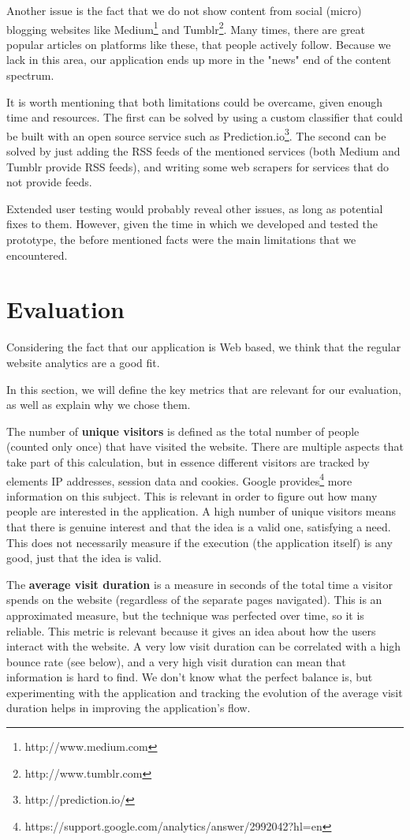 \documentclass{acm_proc_10ptArticle-sp}
\begin{document}
Another issue is the fact that we do not show content from social (micro) blogging websites like Medium\footnote{http://www.medium.com} and Tumblr\footnote{http://www.tumblr.com}. Many times, there are great popular articles on platforms like these, that people actively follow. Because we lack in this area, our application ends up more in the "news" end of the content spectrum.

It is worth mentioning that both limitations could be overcame, given enough time and resources. The first can be solved by using a custom classifier that could be built with an open source service such as Prediction.io\footnote{http://prediction.io/}. The second can be solved by just adding the RSS feeds of the mentioned services (both Medium and Tumblr provide RSS feeds), and writing some web scrapers for services that do not provide feeds.

Extended user testing would probably reveal other issues, as long as potential fixes to them. However, given the time in which we developed and tested the prototype, the before mentioned facts were the main limitations that we encountered.

\section{Evaluation}

Considering the fact that our application is Web based, we think that the regular website analytics are a good fit.

In this section, we will define the key metrics that are relevant for our evaluation, as well as explain why we chose them.

The number of \textbf{unique visitors} is defined as the total number of people (counted only once) that have visited the website. There are multiple aspects that take part of this calculation, but in essence different visitors are tracked by elements IP addresses, session data and cookies. Google provides\footnote{https://support.google.com/analytics/answer/2992042?hl=en} more information on this subject. This is relevant in order to figure out how many people are interested in the application. A high number of unique visitors means that there is genuine interest and that the idea is a valid one, satisfying a need. This does not necessarily measure if the execution (the application itself) is any good, just that the idea is valid.

The \textbf{average visit duration} is a measure in seconds of the total time a visitor spends on the website (regardless of the separate pages navigated). This is an approximated measure, but the technique was perfected over time, so it is reliable. This metric is relevant because it gives an idea about how the users interact with the website. A very low visit duration can be correlated with a high bounce rate (see below), and a very high visit duration can mean that information is hard to find. We don't know what the perfect balance is, but experimenting with the application and tracking the evolution of the average visit duration helps in improving the application's flow.
\end{document}
